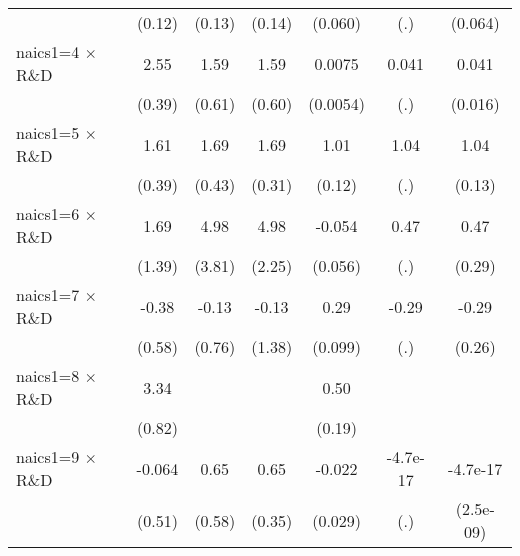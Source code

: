 {\begin{tabular}{l*{6}{c}}
                    &      (0.12)         &      (0.13)         &      (0.14)         &     (0.060)         &         (.)         &     (0.064)         \\
\addlinespace
naics1=4 $\times$ R\&D&        2.55\sym{***}&        1.59\sym{***}&        1.59\sym{**} &      0.0075         &       0.041         &       0.041\sym{**} \\
                    &      (0.39)         &      (0.61)         &      (0.60)         &    (0.0054)         &         (.)         &     (0.016)         \\
\addlinespace
naics1=5 $\times$ R\&D&        1.61\sym{***}&        1.69\sym{***}&        1.69\sym{***}&        1.01\sym{***}&        1.04         &        1.04\sym{***}\\
                    &      (0.39)         &      (0.43)         &      (0.31)         &      (0.12)         &         (.)         &      (0.13)         \\
\addlinespace
naics1=6 $\times$ R\&D&        1.69         &        4.98         &        4.98\sym{**} &      -0.054         &        0.47         &        0.47         \\
                    &      (1.39)         &      (3.81)         &      (2.25)         &     (0.056)         &         (.)         &      (0.29)         \\
\addlinespace
naics1=7 $\times$ R\&D&       -0.38         &       -0.13         &       -0.13         &        0.29\sym{***}&       -0.29         &       -0.29         \\
                    &      (0.58)         &      (0.76)         &      (1.38)         &     (0.099)         &         (.)         &      (0.26)         \\
\addlinespace
naics1=8 $\times$ R\&D&        3.34\sym{***}&                     &                     &        0.50\sym{***}&                     &                     \\
                    &      (0.82)         &                     &                     &      (0.19)         &                     &                     \\
\addlinespace
naics1=9 $\times$ R\&D&      -0.064         &        0.65         &        0.65\sym{*}  &      -0.022         &    -4.7e-17         &    -4.7e-17         \\
                    &      (0.51)         &      (0.58)         &      (0.35)         &     (0.029)         &         (.)         &   (2.5e-09)         \\

\end{tabular}}

